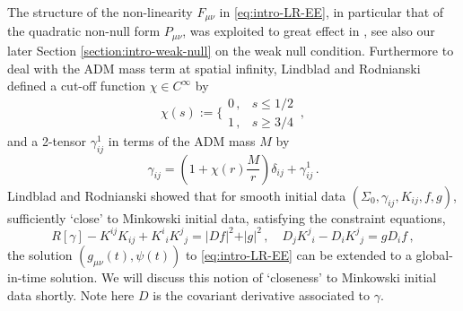 \documentclass[11pt, a4paper]{amsart}
\numberwithin{equation}{section}
\numberwithin{theorem}{section}
\newcommand{\mn}{{\mu \nu}}
\begin{document}
The structure of the non-linearity $F_\mn$ in \eqref{eq:intro-LR-EE}, in particular that of the quadratic non-null form $P_\mn$,  was exploited to great effect in \cite{LR:04}, see also our later Section \ref{section:intro-weak-null} on the weak null condition. 
Furthermore to deal with the ADM mass term at spatial infinity, Lindblad and Rodnianski defined a cut-off function $\chi \in C^\infty$ by
\begin{equation} \chi(s) := \Bigg\lbrace
	\begin{array}{ll} 0\,,  & s \leq 1/2 \\
		1 \,, &  s \geq 3/4 
	\end{array} \,, \label{eq:intro-chi} \end{equation}
and a 2-tensor $\gamma^1_{ij}$ in terms of the ADM mass $M$ by
\begin{equation} \gamma_{ij} = \left( 1+ \chi(r) \frac{M}{r}  \right) \delta_{ij} +  \gamma^1_{ij} \,.
 \label{eq:intro-def-gamma1} \end{equation}
Lindblad and Rodnianski showed that for smooth initial data $( \Sigma_0, \gamma_{ij}, K_{ij}, f, g)$, sufficiently `close' to Minkowski initial data, satisfying the constraint equations,
$$ R[\gamma] - K^{ij} K_{ij} + K^i{}_i K^j{}_j= \vert D f \vert^2 + \vert g \vert^2 \,, \quad D_j K^j {}_i - D_i K^j{}_j = g D_i f \,,$$
the solution $(g_\mn(t), \psi(t))$ to \eqref{eq:intro-LR-EE} can be extended to a global-in-time solution. We will discuss this notion of `closeness' to Minkowski initial data shortly. 
Note here $D$ is the covariant derivative associated to $\gamma$.  \\
\end{document}
